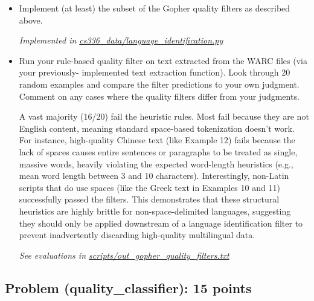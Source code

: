 \documentclass[letterpaper]{article}
\begin{document}
\begin{itemize}
	\item[(a)] Implement (at least) the subset of the Gopher quality filters as described above.

	\textit{Implemented in  \href{https://github.com/echung32/ece405-assignment2-data/blob/main/cs336_data/language_identification.py}{cs336\_data/language\_identification.py}}

	\item[(b)] Run your rule-based quality filter on text extracted from the WARC files (via your previously- implemented text extraction function). Look through 20 random examples and compare the filter predictions to your own judgment. Comment on any cases where the quality filters differ from your judgments.

	A vast majority (16/20) fail the heuristic rules. Most fail because they are not English content, meaning standard space-based tokenization doesn't work. For instance, high-quality Chinese text (like Example 12) fails because the lack of spaces causes entire sentences or paragraphs to be treated as single, massive words, heavily violating the expected word-length heuristics (e.g., mean word length between 3 and 10 characters). Interestingly, non-Latin scripts that do use spaces (like the Greek text in Examples 10 and 11) successfully passed the filters. This demonstrates that these structural heuristics are highly brittle for non-space-delimited languages, suggesting they should only be applied downstream of a language identification filter to prevent inadvertently discarding high-quality multilingual data.

	\textit{See evaluations in  \href{https://github.com/echung32/ece405-assignment2-data/blob/main/scripts/out_gopher_quality_filters.txt}{scripts/out\_gopher\_quality\_filters.txt}}

\end{itemize}

\subsection{Problem (quality\_classifier): 15 points}
\end{document}

